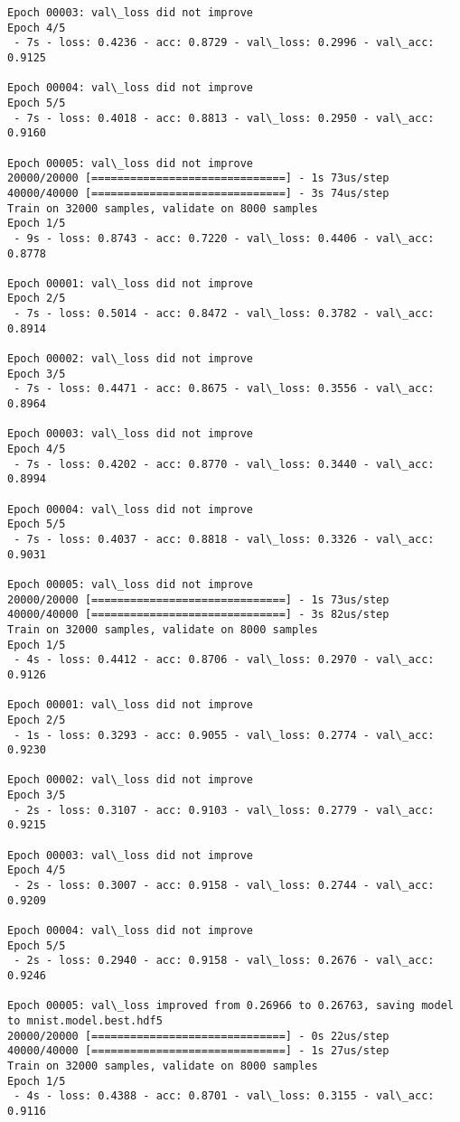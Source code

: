\documentclass[11pt]{article}
\begin{document}
\begin{Verbatim}[commandchars=\\\{\}]
Epoch 00003: val\_loss did not improve
Epoch 4/5
 - 7s - loss: 0.4236 - acc: 0.8729 - val\_loss: 0.2996 - val\_acc: 0.9125

Epoch 00004: val\_loss did not improve
Epoch 5/5
 - 7s - loss: 0.4018 - acc: 0.8813 - val\_loss: 0.2950 - val\_acc: 0.9160

Epoch 00005: val\_loss did not improve
20000/20000 [==============================] - 1s 73us/step
40000/40000 [==============================] - 3s 74us/step
Train on 32000 samples, validate on 8000 samples
Epoch 1/5
 - 9s - loss: 0.8743 - acc: 0.7220 - val\_loss: 0.4406 - val\_acc: 0.8778

Epoch 00001: val\_loss did not improve
Epoch 2/5
 - 7s - loss: 0.5014 - acc: 0.8472 - val\_loss: 0.3782 - val\_acc: 0.8914

Epoch 00002: val\_loss did not improve
Epoch 3/5
 - 7s - loss: 0.4471 - acc: 0.8675 - val\_loss: 0.3556 - val\_acc: 0.8964

Epoch 00003: val\_loss did not improve
Epoch 4/5
 - 7s - loss: 0.4202 - acc: 0.8770 - val\_loss: 0.3440 - val\_acc: 0.8994

Epoch 00004: val\_loss did not improve
Epoch 5/5
 - 7s - loss: 0.4037 - acc: 0.8818 - val\_loss: 0.3326 - val\_acc: 0.9031

Epoch 00005: val\_loss did not improve
20000/20000 [==============================] - 1s 73us/step
40000/40000 [==============================] - 3s 82us/step
Train on 32000 samples, validate on 8000 samples
Epoch 1/5
 - 4s - loss: 0.4412 - acc: 0.8706 - val\_loss: 0.2970 - val\_acc: 0.9126

Epoch 00001: val\_loss did not improve
Epoch 2/5
 - 1s - loss: 0.3293 - acc: 0.9055 - val\_loss: 0.2774 - val\_acc: 0.9230

Epoch 00002: val\_loss did not improve
Epoch 3/5
 - 2s - loss: 0.3107 - acc: 0.9103 - val\_loss: 0.2779 - val\_acc: 0.9215

Epoch 00003: val\_loss did not improve
Epoch 4/5
 - 2s - loss: 0.3007 - acc: 0.9158 - val\_loss: 0.2744 - val\_acc: 0.9209

Epoch 00004: val\_loss did not improve
Epoch 5/5
 - 2s - loss: 0.2940 - acc: 0.9158 - val\_loss: 0.2676 - val\_acc: 0.9246

Epoch 00005: val\_loss improved from 0.26966 to 0.26763, saving model to mnist.model.best.hdf5
20000/20000 [==============================] - 0s 22us/step
40000/40000 [==============================] - 1s 27us/step
Train on 32000 samples, validate on 8000 samples
Epoch 1/5
 - 4s - loss: 0.4388 - acc: 0.8701 - val\_loss: 0.3155 - val\_acc: 0.9116


\end{Verbatim}
\end{document}
